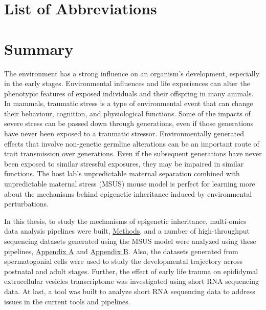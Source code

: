 \documentclass[12pt,twoside]{reedthesis}
\begin{document}
\begin{acknowledgements}
  \end{acknowledgements}

  \hypersetup{linkcolor=black}
  \setcounter{secnumdepth}{4}
  \setcounter{tocdepth}{4}
  \tableofcontents

  \listoftables

  \listoffigures



\mainmatter %
\pagestyle{fancyplain} %

\hypertarget{list-of-abbreviations}{%
\chapter*{List of Abbreviations}\label{list-of-abbreviations}}

\hypertarget{summary}{%
\chapter*{Summary}\label{summary}}

The environment has a strong influence on an organism's development, especially in the early stages. Environmental influences and life experiences can alter the phenotypic features of exposed individuals and their offspring in many animals. In mammals, traumatic stress is a type of environmental event that can change their behaviour, cognition, and physiological functions. Some of the impacts of severe stress can be passed down through generations, even if those generations have never been exposed to a traumatic stressor. Environmentally generated effects that involve non-genetic germline alterations can be an important route of trait transmission over generations. Even if the subsequent generations have never been exposed to similar stressful exposures, they may be impaired in similar functions. The host lab's unpredictable maternal separation combined with unpredictable maternal stress (MSUS) mouse model is perfect for learning more about the mechanisms behind epigenetic inheritance induced by environmental perturbations.

In this thesis, to study the mechanisms of epigenetic inheritance, multi-omics data analysis pipelines were built, \protect\hyperlink{methods}{Methods}, and a number of high-throughput sequencing datasets generated using the MSUS model were analyzed using these pipelines, \protect\hyperlink{aa}{Appendix A} and \protect\hyperlink{ab}{Appendix B}. Also, the datasets generated from spermatogonial cells were used to study the developmental trajectory across postnatal and adult stages. Further, the effect of early life trauma on epididymal extracellular vesicles transcriptome was investigated using short RNA sequencing data. At last, a tool was built to analyze short RNA sequencing data to address issues in the current tools and pipelines.
\end{document}
